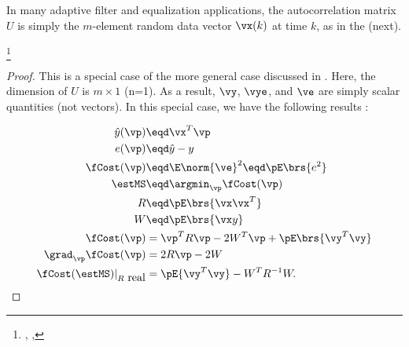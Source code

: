 In many adaptive filter and equalization applications,
the autocorrelation matrix $U$ is simply the $m$-element
random data vector $\vx(k)$ at time $k$, as in the  (next).
\begin{corollary}
\footnote{
  ,
  ,
  }
\end{corollary}
\begin{proof}
This is a special case of the more general case discussed
in .
Here, the dimension of $U$ is $m\times1$ (n=1).
As a result,
$\vy$, $\vye$, and $\ve$ are simply scalar quantities (not vectors).
In this special case, we have the following results
:

\begin{align*}
   \hat{y}(\vp)   &\eqd \vx^T \vp    \\
   e(\vp)    &\eqd \hat{y}-y \\
   \fCost(\vp) &\eqd \E\norm{\ve}^2 \eqd \pE\brs{e^2} \\
   \estMS      &\eqd \argmin_\vp \fCost(\vp)  \\
   R           &\eqd \pE\brs{\vx\vx^T}   \\
   W           &\eqd \pE\brs{ \vx y }    \\
    \fCost(\vp)                     &= \vp^T R \vp -2W^T\vp  + \pE\brs{\vy^T\vy} \\
    \grad_\vp \fCost(\vp)           &= 2R\vp - 2W  \\
    \fCost(\estMS)|_{R\mbox{ real}} &=    \pE{\vy^T\vy} - W^T R^{-1}W.
\end{align*}
\end{proof}

